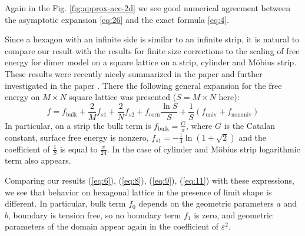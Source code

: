 \documentclass{article}
\begin{document}
Again in the Fig. \ref{fig:approx-acc-2d} we see good numerical agreement between the asymptotic
expansion \eqref{eq:26} and the exact formula \eqref{eq:4}.

Since a hexagon with an infinite side is similar to an infinite strip,
it is natural to compare our result with the results for finite size
corrections to the scaling of free energy for dimer model on a square
lattice on a strip, cylinder and Möbius strip. These results were
recently nicely summarized in the paper \cite{izmailian2017finite} and
further investigated in the paper \cite{Sh_Izmailian_2019}. There the
following general expansion for the free energy on $M\times N$ square
lattice was presented ($S=M\times N$ here):
\begin{equation}
  \label{eq:32}
  f=f_{\mathrm{bulk}}+\frac{2}{M}f_{s1}+\frac{2}{N}f_{s2}
  +f_{\mathrm{corn}}\frac{\ln S}{S} +\frac{1}{S} (f_{\mathrm{univ}}+f_{\mathrm{nonuniv}})
\end{equation}
In particular, on a strip the bulk term is
$f_{\mathrm{bulk}}=\frac{G}{\pi}$, where $G$ is the Catalan constant,
surface free energy is nonzero, $f_{s1}=-\frac{1}{4}\ln(1+\sqrt{2})$ 
and the coefficient of $\frac{1}{S}$ is equal to $\frac{\pi}{24}$. In
the case of cylinder and  Möbius strip logarithmic term also appears.

Comparing our results (\ref{eq:6}), (\ref{eq:8}), (\ref{eq:9}),
(\ref{eq:11}) with these expressions, we see that behavior on
hexagonal lattice in the presence of limit shape is different. In
particular, bulk term $f_{0}$ depends on the geometric parameters $a$
and $b$, boundary is
tension free, so no boundary term $f_{1}$ is zero, and geometric
parameters of the domain appear again in the coefficient of
$\varepsilon^{2}$. 
\end{document}
